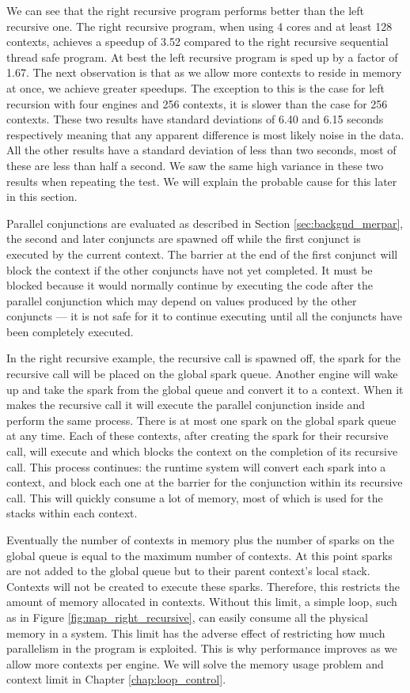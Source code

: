 We can see that the right recursive program performs better than the left
recursive one.
The right recursive program, when using 4 cores and at least 128 contexts,
achieves a speedup of 3.52 compared to the right recursive sequential thread
safe program.
At best the left recursive program is sped up by a factor of 1.67.
The next observation is that as we allow more contexts to reside in memory
at once,
we achieve greater speedups.
The exception to this is the case for left recursion with four engines and
256 contexts, it is slower than the case for 256 contexts.
These two results have standard deviations of 6.40 and 6.15 seconds
respectively meaning that any apparent difference is most likely 
noise in the data.
All the other results have a standard deviation of less than two seconds,
most of these are less than half a second.
We saw the same high variance in these two results when repeating the test.
We will explain the probable cause for this later in this section.

Parallel conjunctions are evaluated as described in Section
\ref{sec:backgnd_merpar},
the second and later conjuncts are spawned off while the first conjunct is
executed by the current context.
The barrier at the end of the first conjunct will block the context if
the other conjuncts have not yet completed.
It must be blocked because it would normally continue by executing the code
after the parallel conjunction
which may depend on values produced by the other conjuncts ---
it is not safe for it to continue executing until all the conjuncts have
been completely executed.

In the right recursive example,
the recursive call is spawned off,
the spark for the recursive call will be placed on the global spark queue.
Another engine will wake up and take the spark from the global queue and
convert it to a context.
When it makes the recursive call it will execute the parallel conjunction
inside and perform the same process.
There is at most one spark on the global spark queue at any time.
Each of these contexts,
after creating the spark for their recursive call,
will execute  and
\joinandcontinue which blocks the context on the completion of
its recursive call.
This process continues:
the runtime system will convert each spark into a context,
and block each one at the barrier for the conjunction within its
recursive call.
This will quickly consume a lot of memory,
most of which is used for the stacks within each context.

Eventually the number of contexts in memory plus
the number of sparks on the global queue is equal to the maximum number of
contexts.
At this point sparks are not added to the global queue but to their parent
context's local stack.
Contexts will not be created to execute these sparks.
Therefore,
this restricts the amount of memory allocated in contexts.
Without this limit,
a simple loop, such as in Figure \ref{fig:map_right_recursive}, 
can easily consume all the physical memory in a system.
This limit has the adverse effect of restricting how much parallelism
in the program is exploited.
This is why performance improves as we allow more contexts per engine.
We will solve the memory usage problem and context limit in
Chapter \ref{chap:loop_control}.

